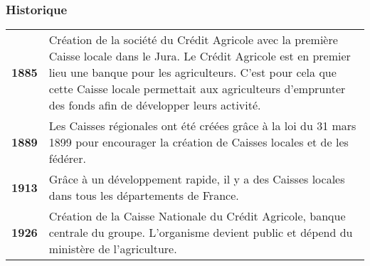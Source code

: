 \documentclass[12pt,a4paper]{article}
\begin{document}
\subsubsection{Historique}
\begin{tabular}{lp{15.5cm}}
\textbf{1885} & Création de la société du Crédit Agricole avec la première Caisse locale dans le Jura. Le Crédit Agricole est en premier lieu une banque pour les agriculteurs. C'est pour cela que cette Caisse locale permettait aux agriculteurs d'emprunter des fonds afin de développer leurs activité.\medskip \\
\textbf{1889} & Les Caisses régionales ont été créées grâce à la loi du 31 mars 1899 pour encourager la création de Caisses locales et de les fédérer.\medskip \\
\textbf{1913} & Grâce à un développement rapide, il y a des Caisses locales dans tous les départements de France.\medskip \\
\textbf{1926} & Création de la Caisse Nationale du Crédit Agricole, banque centrale du groupe. L'organisme devient public et dépend du ministère de l'agriculture.\medskip \\
\end{tabular}
\end{document}
